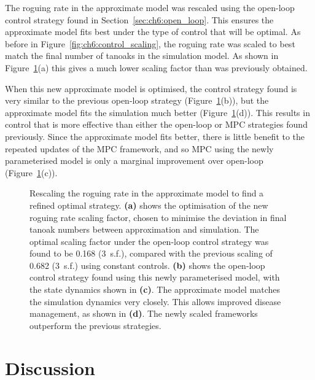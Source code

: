 The roguing rate in the approximate model was rescaled using the open-loop control strategy found in Section~\ref{sec:ch6:open_loop}. This ensures the approximate model fits best under the type of control that will be optimal. As before in Figure~\ref{fig:ch6:control_scaling}, the roguing rate was scaled to best match the final number of tanoaks in the simulation model. As shown in Figure~\ref{fig:ch6:Global_optimal}(a) this gives a much lower scaling factor than was previously obtained.

When this new approximate model is optimised, the control strategy found is very similar to the previous open-loop strategy (Figure~\ref{fig:ch6:Global_optimal}(b)), but the approximate model fits the simulation much better (Figure~\ref{fig:ch6:Global_optimal}(d)). This results in control that is more effective than either the open-loop or MPC strategies found previously. Since the approximate model fits better, there is little benefit to the repeated updates of the MPC framework, and so MPC using the newly parameterised model is only a marginal improvement over open-loop (Figure~\ref{fig:ch6:Global_optimal}(c)).

\begin{figure}[H]
    \begin{center}
        \caption[Refined optimal strategy under rescaled roguing rate]{Rescaling the roguing rate in the approximate model to find a refined optimal strategy. \textbf{(a)} shows the optimisation of the new roguing rate scaling factor, chosen to minimise the deviation in final tanoak numbers between approximation and simulation. The optimal scaling factor under the open-loop control strategy was found to be 0.168 (3~s.f.), compared with the previous scaling of 0.682 (3~s.f.) using constant controls. \textbf{(b)} shows the open-loop control strategy found using this newly parameterised model, with the state dynamics shown in \textbf{(c)}. The approximate model matches the simulation dynamics very closely. This allows improved disease management, as shown in \textbf{(d)}. The newly scaled frameworks outperform the previous strategies.\label{fig:ch6:Global_optimal}}
    \end{center}
\end{figure}

\section{Discussion\label{sec:ch6:discussion}}

